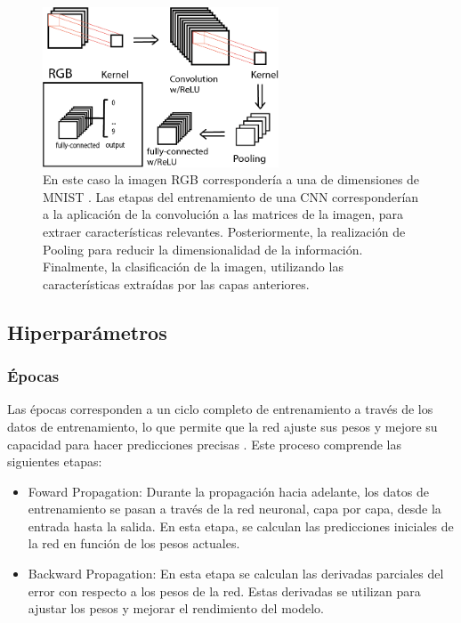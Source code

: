 \documentclass[journal]{IEEEtai}
\begin{document}
\begin{figure}[H]
\centering
\includegraphics[width=7cm]{img/stagesconv.png}
\caption{En este caso la imagen RGB correspondería a una de dimensiones de MNIST \cite{MNIST}. Las etapas del entrenamiento de una CNN corresponderían a la aplicación de la convolución a las matrices de la imagen, para extraer características relevantes. Posteriormente, la realización de Pooling para reducir la dimensionalidad de la información. Finalmente, la clasificación de la imagen, utilizando las características extraídas por las capas anteriores.}
\label{fig: convpoo}
\end{figure}

\subsection{Hiperparámetros}

\subsubsection{\textbf{Épocas}}

Las épocas corresponden a un ciclo completo de entrenamiento a través de los datos de entrenamiento, lo que permite que la red ajuste sus pesos y mejore su capacidad para hacer predicciones precisas \cite{Epocas}. Este proceso comprende las siguientes etapas:
\begin{itemize}
\item	Foward Propagation: Durante la propagación hacia adelante, los datos de entrenamiento se pasan a través de la red neuronal, capa por capa, desde la entrada hasta la salida. En esta etapa, se calculan las predicciones iniciales de la red en función de los pesos actuales.
\item	Backward Propagation: En esta etapa se calculan las derivadas parciales del error con respecto a los pesos de la red. Estas derivadas se utilizan para ajustar los pesos y mejorar el rendimiento del modelo. 
\end{itemize}
\end{document}
